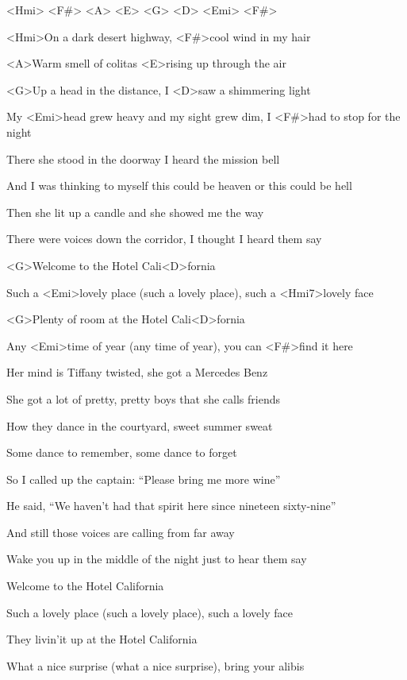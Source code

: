 

<Hmi> <F#> <A> <E> <G> <D> <Emi> <F#>

\zs
<Hmi>On a dark desert highway,
<F#>cool wind in my hair

<A>Warm smell of colitas
<E>rising up through the air

<G>Up a head in the distance,
I <D>saw a shimmering light

My <Emi>head grew heavy and my sight grew dim,
I <F#>had to stop for the night
\ks

\zs
There she stood in the doorway
I heard the mission bell

And I was thinking to myself
this could be heaven or this could be hell

Then she lit up a candle
and she showed me the way

There were voices down the corridor,
I thought I heard them say
\ks

\zr
<G>Welcome to the Hotel Cali<D>fornia

Such a <Emi>lovely place (such a lovely place),
such a <Hmi7>lovely face

<G>Plenty of room at the Hotel Cali<D>fornia

Any <Emi>time of year (any time of year),
you can <F#>find it here
\kr

\zs
Her mind is Tiffany twisted,
she got a Mercedes Benz

She got a lot of pretty,
pretty boys that she calls friends

How they dance in the courtyard,
sweet summer sweat

Some dance to remember,
some dance to forget
\ks

\zs
So I called up the captain:
``Please bring me more wine''

He said, ``We haven't had that spirit
here since nineteen sixty-nine''

And still those voices are calling from far away

Wake you up in the middle of the night
just to hear them say
\ks

\zr
Welcome to the Hotel California

Such a lovely place (such a lovely place),
such a lovely face

They livin'it up at the Hotel California

What a nice surprise (what a nice surprise),
bring your alibis
\kr

